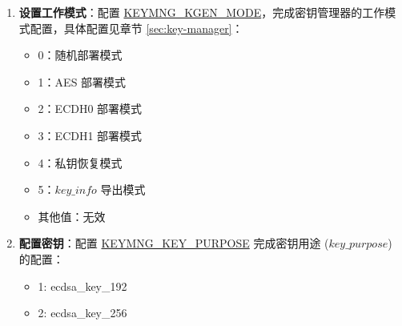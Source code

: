 \documentclass[main\_\_CN.tex]{subfiles}
\begin{document}
\begin{enumerate}
\begin{itemize}
        \item \textbf{\hyperref[fielddesc:EFUSEKMRNDSWITCHCYCLE]{EFUSE\_KM\_RND\_SWITCH\_CYCLE}}：配置密钥管理器切换随机数的周期。注意：此切换周期建议配置为 TRNG 模块的时钟周期所对应的密钥管理器时钟周期数。
        \begin{itemize}
            \item 0：切换周期由 \hyperref[fielddesc:KEYMNGRNDSWITCHCYCLE]{KEYMNG\_RND\_SWITCH\_CYCLE} 控制
            \item 1：8 个密钥管理器时钟周期
            \item 2：16 个密钥管理器时钟周期
            \item 3：32 个密钥管理器时钟周期
        \end{itemize}
        \item \textbf{\hyperref[fielddesc:KEYMNGRNDSWITCHCYCLE]{KEYMNG\_RND\_SWITCH\_CYCLE}}：配置密钥管理器切换随机数的周期，单位为密钥管理器时钟周期。仅当 \hyperref[fielddesc:EFUSEKMRNDSWITCHCYCLE]{EFUSE\_KM\_RND\_SWITCH\_CYCLE} 为 0 时生效。注意：此切换周期建议配置为 TRNG 模块的时钟周期所对应的密钥管理器时钟周期数。
    \end{itemize}
    \item \textbf{设置工作模式}：配置 \hyperref[fielddesc:KEYMNGKGENMODE]{KEYMNG\_KGEN\_MODE}，完成密钥管理器的工作模式配置，具体配置见章节 \ref{sec:key-manager}：
    \begin{itemize}
        \item 0：随机部署模式
        \item 1：AES 部署模式
        \item 2：ECDH0 部署模式
        \item 3：ECDH1 部署模式
        \item 4：私钥恢复模式
        \item 5：\hyperref[para:keyinfo]{\begin{math}key\_info\end{math}} 导出模式
        \item 其他值：无效
    \end{itemize}
    \label{sec:keymng-key-purpose}
    \item \textbf{配置密钥}：配置 \hyperref[fielddesc:KEYMNGKEYPURPOSE]{KEYMNG\_KEY\_PURPOSE} 完成密钥用途 (\begin{math}key\_purpose\end{math}) 的配置：
    \begin{itemize}
        \item 1: ecdsa\_key\_192
        \item 2: ecdsa\_key\_256

\end{itemize}
\end{enumerate}
\end{document}
